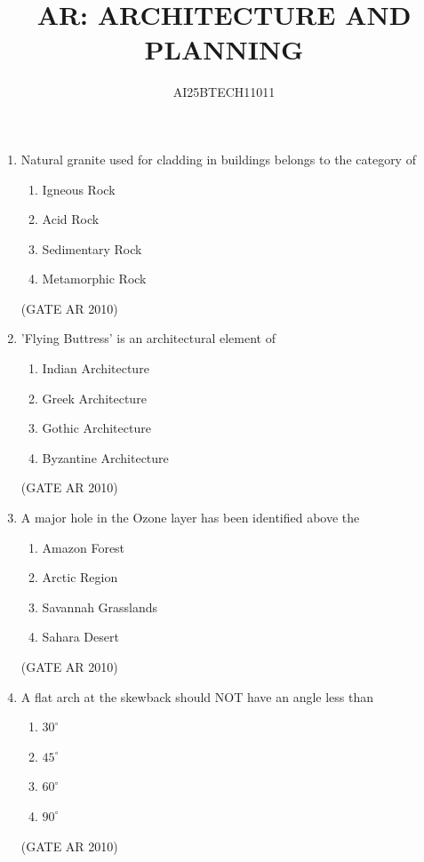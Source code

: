 \documentclass[journal]{IEEEtran}
\begin{document}
\title{
AR: ARCHITECTURE AND PLANNING}
\author{AI25BTECH11011}
\maketitle
\renewcommand{\thefigure}{\theenumi}
\renewcommand{\thetable}{\theenumi}

\begin{enumerate}

\item Natural granite used for cladding in buildings belongs to the category of
\begin{multicols}{4}
\begin{enumerate}
\item Igneous Rock
\item Acid Rock
\item Sedimentary Rock
\item Metamorphic Rock
\end{enumerate}
\end{multicols}
\hfill (GATE AR 2010)

\item 'Flying Buttress' is an architectural element of
\begin{multicols}{2}
\begin{enumerate}
\item Indian Architecture
\item Greek Architecture
\item Gothic Architecture
\item Byzantine Architecture
\end{enumerate}
\end{multicols}
\hfill (GATE AR 2010)

\item A major hole in the Ozone layer has been identified above the
\begin{multicols}{2}
\begin{enumerate}
\item Amazon Forest
\item Arctic Region
\item Savannah Grasslands
\item Sahara Desert
\end{enumerate}
\end{multicols}
\hfill (GATE AR 2010)

\item A flat arch at the skewback should NOT have an angle less than
\begin{multicols}{4}
\begin{enumerate}
\item $30^\circ$
\item $45^\circ$
\item $60^\circ$
\item $90^\circ$
\end{enumerate}
\end{multicols}
\hfill (GATE AR 2010)


\end{enumerate}
\end{document}
